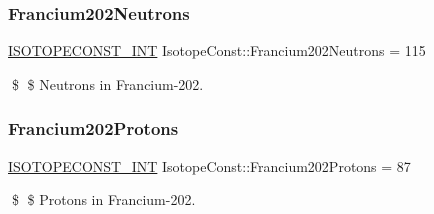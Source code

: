 \subsubsection{\texorpdfstring{Francium202\+Neutrons}{Francium202Neutrons}}
{\footnotesize\ttfamily \mbox{\hyperlink{group___isotope_const-_macros_ga5f18360b3e99483a35c32d789e62621c}{I\+S\+O\+T\+O\+P\+E\+C\+O\+N\+S\+T\+\_\+\+I\+NT}} Isotope\+Const\+::\+Francium202\+Neutrons = 115}

\$ \$ Neutrons in Francium-\/202. \mbox{\label{group___isotope_const-_francium-_fr202_ga05e22aa473de4684683be09cf246ef43}} 
\subsubsection{\texorpdfstring{Francium202\+Protons}{Francium202Protons}}
{\footnotesize\ttfamily \mbox{\hyperlink{group___isotope_const-_macros_ga5f18360b3e99483a35c32d789e62621c}{I\+S\+O\+T\+O\+P\+E\+C\+O\+N\+S\+T\+\_\+\+I\+NT}} Isotope\+Const\+::\+Francium202\+Protons = 87}

\$ \$ Protons in Francium-\/202. 